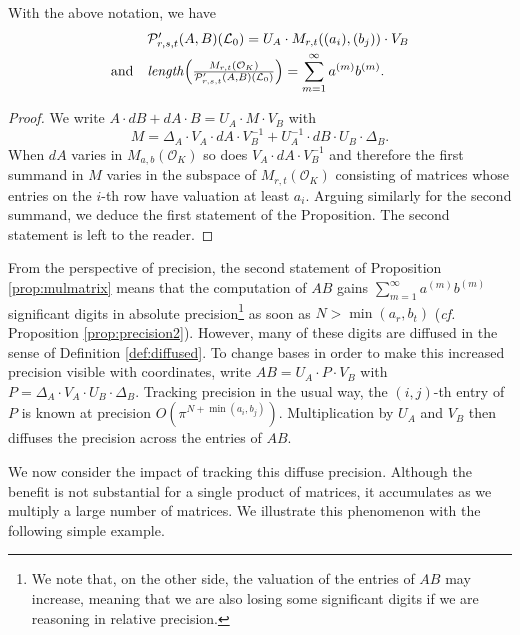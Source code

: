 \documentclass{sig-alternate}
\renewcommand{\O}{\mathcal O}
\begin{document}
\begin{prop}
\label{prop:mulmatrix}
With the above notation, we have
\[
\begin{array}{rl}
& \mathcal P'_{r,s,t}(A,B)(\mathcal L_0)
= U_A \cdot M_{r,t}((a_i),(b_j)) \cdot V_B \smallskip \\
\text{and} &
\text{\emph{length}}\Big(\frac{M_{r,t}(\O_K)}{\mathcal P'_{r,s,t}(A,B)(\mathcal L_0) }
\Big) =
\displaystyle 
\sum_{m=1}^\infty a^{(m)} b^{(m)}.
\end{array}
\]
\end{prop}

\begin{proof}
We write $A \cdot dB + dA \cdot B = U_A \cdot M \cdot V_B$ with
$$M = \Delta_A \cdot V_A \cdot dA \cdot V_B^{-1} 
+ U_A^{-1} \cdot dB \cdot U_B \cdot \Delta_B.$$
When $dA$ varies in $M_{a,b}(\O_K)$ so does $V_A \cdot dA \cdot V_B^{-1}$
and therefore the first summand in $M$ varies in the subspace of 
$M_{r,t}(\O_K)$ consisting of matrices whose entries on the $i$-th
row have valuation at least $a_i$. Arguing similarly for the second
summand, we deduce the first statement of the Proposition. The second
statement is left to the reader.
\end{proof}

From the perspective of precision, the second statement of Proposition \ref{prop:mulmatrix}
means that the computation of $AB$ gains $\sum_{m=1}^\infty 
a^{(m)} b^{(m)}$ significant digits in absolute precision\footnote{We 
note that, on the other side, the valuation of the entries of $AB$ may 
increase, meaning that we are also losing some significant digits if we 
are reasoning in relative precision.} as soon as $N > \min(a_r, b_t)$ 
(\emph{cf.} Proposition \ref{prop:precision2}). However, many of these digits are 
diffused in the sense of Definition \ref{def:diffused}.
To change bases in order to make this increased precision visible
with coordinates, write 
$AB = U_A \cdot P \cdot V_B$ with
$P = \Delta_A \cdot V_A \cdot U_B \cdot \Delta_B$.
Tracking precision in the usual way, the $(i,j)$-th entry
of $P$ is known at precision $O(\pi^{N + \min(a_i,b_j)})$.  Multiplication by
$U_A$ and $V_B$ then diffuses the precision across the entries of $AB$.

\smallskip

We now consider the impact of tracking this diffuse precision.
Although the benefit is not substantial for
a single product of matrices, it accumulates as we multiply a large
number of matrices.  We illustrate this phenomenon with the following simple
example.
\end{document}
